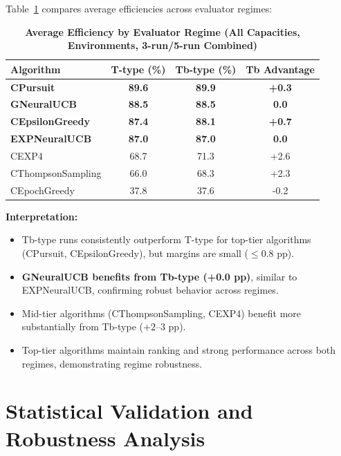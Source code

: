 \documentclass[12pt,a4paper]{article}
\newcommand{\performance}[1]{\textcolor{performancecolor}{\textbf{#1}}}
\newcommand{\legacy}[1]{\textcolor{legacycolor}{\textbf{#1}}}
\newcommand{\neural}[1]{\textcolor{neuralcolor}{\textbf{#1}}}
\begin{document}
Table~\ref{tab:regime-comparison} compares average efficiencies across evaluator regimes:

\begin{table}[H]
\centering
\caption{\performance{Average Efficiency by Evaluator Regime (All Capacities, Environments, 3-run/5-run Combined)}}
\label{tab:regime-comparison}
\begin{tabular}{|l|c|c|c|}
\hline
\textbf{Algorithm} & \textbf{T-type (\%)} & \textbf{Tb-type (\%)} & \textbf{Tb Advantage} \\
\hline
\hline
\performance{CPursuit}        & \performance{89.6} & \performance{89.9} & \performance{+0.3} \\
\neural{GNeuralUCB}          & \neural{88.5} & \neural{88.5} & \neural{0.0} \\
\performance{CEpsilonGreedy} & \performance{87.4} & \performance{88.1} & \performance{+0.7} \\
\legacy{EXPNeuralUCB}        & \legacy{87.0}     & \legacy{87.0}     & \legacy{0.0} \\
CEXP4                        & 68.7              & 71.3              & +2.6 \\
CThompsonSampling            & 66.0              & 68.3              & +2.3 \\
CEpochGreedy                 & 37.8              & 37.6              & -0.2 \\
\hline
\end{tabular}
\end{table}

\textbf{Interpretation:}
\begin{itemize}
\item Tb-type runs consistently outperform T-type for top-tier algorithms (CPursuit, CEpsilonGreedy), but margins are small ($\leq$0.8 pp).
\item \neural{GNeuralUCB benefits from Tb-type (+0.0 pp)}, similar to EXPNeuralUCB, confirming robust behavior across regimes.
\item Mid-tier algorithms (CThompsonSampling, CEXP4) benefit more substantially from Tb-type ($+2$--3 pp).
\item Top-tier algorithms maintain ranking and strong performance across both regimes, demonstrating regime robustness.
\end{itemize}

\section{Statistical Validation and Robustness Analysis}
\end{document}
